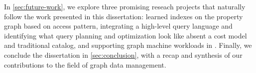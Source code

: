 In \autoref{sec:future-work}, we explore three promising reseach projects that naturally follow the work presented in this dissertation: learned indexes on the property graph based on access pattern, integrating a high-level query language and identifying what query planning and optimization look like absent a cost model and traditional catalog, and supporting graph machine workloads in \project{}.
Finally, we conclude the dissertation in \autoref{sec:conclusion}, with a recap and synthesis of our contributions to the field of graph data management.